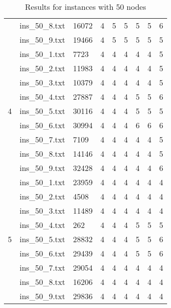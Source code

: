 \begin{table}[]
\begin{tabular}{lllllllll}
& ins\_50\_8.txt & 16072 & 4 & 5 & 5 & 5  & 5   & 6 \\
& ins\_50\_9.txt & 19466 & 4 & 5 & 5 & 5  & 5   & 5 \\
\hline 
\multirow{9}{*}{4}
& ins\_50\_1.txt & 7723  & 4 & 4 & 4 & 4  & 4   & 5 \\
& ins\_50\_2.txt & 11983 & 4 & 4 & 4 & 4  & 4   & 5 \\
& ins\_50\_3.txt & 10379 & 4 & 4 & 4 & 4  & 4   & 5 \\
& ins\_50\_4.txt & 27887 & 4 & 4 & 4 & 5  & 5   & 6 \\
& ins\_50\_5.txt & 30116 & 4 & 4 & 4 & 5  & 5   & 5 \\
& ins\_50\_6.txt & 30994 & 4 & 4 & 4 & 6  & 6   & 6 \\
& ins\_50\_7.txt & 7109  & 4 & 4 & 4 & 4  & 4   & 5 \\
& ins\_50\_8.txt & 14146 & 4 & 4 & 4 & 4  & 4   & 5 \\
& ins\_50\_9.txt & 32428 & 4 & 4 & 4 & 4  & 4   & 6 \\
\hline 
\multirow{9}{*}{5}
& ins\_50\_1.txt & 23959 & 4 & 4 & 4 & 4  & 4   & 4 \\
& ins\_50\_2.txt & 4508  & 4 & 4 & 4 & 4  & 4   & 4 \\
& ins\_50\_3.txt & 11489 & 4 & 4 & 4 & 4  & 4   & 4 \\
& ins\_50\_4.txt & 262   & 4 & 4 & 4 & 5  & 5   & 5 \\
& ins\_50\_5.txt & 28832 & 4 & 4 & 4 & 5  & 5   & 6 \\
& ins\_50\_6.txt & 29439 & 4 & 4 & 4 & 5  & 5   & 6 \\
& ins\_50\_7.txt & 29054 & 4 & 4 & 4 & 4  & 4   & 4 \\
& ins\_50\_8.txt & 16206 & 4 & 4 & 4 & 4  & 4   & 4 \\
& ins\_50\_9.txt & 29836 & 4 & 4 & 4 & 4  & 4   & 4
\end{tabular}
\caption{Results for instances with 50 nodes}
\label{tab:ins50}
\end{table}

